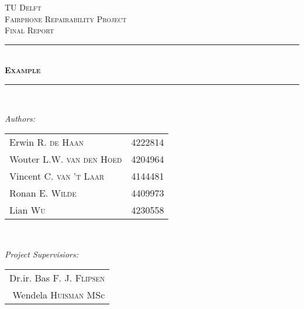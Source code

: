 \documentclass[12pt]{scrreprt}
\begin{document}
\begin{titlepage}

\newcommand{\HRule}{\rule{\linewidth}{0.5mm}} %

\center %
 

\textsc{\LARGE TU Delft}\\[1.5cm] %
\textsc{\Large Fairphone Repairability Project}\\[0.5cm] %
\textsc{\large Final Report}\\[0.5cm] %


\HRule \\[0.4cm]
\textsc{\huge \bfseries Example}\\[0.2cm] %
\HRule \\[1.5cm]
 

\begin{minipage}{0.45\textwidth}
\begin{flushleft} \large
\emph{Authors:}\\
\begin{tabular}{ll}
Erwin R. \textsc{de Haan} & 4222814\\
Wouter L.W. \textsc{van den Hoed} & 4204964 \\
Vincent C. \textsc{van 't Laar} & 4144481 \\
Ronan E. \textsc{Wilde} & 4409973 \\
Lian \textsc{Wu} & 4230558 \\
\end{tabular}

\end{flushleft}
\end{minipage}
~
\begin{minipage}{0.45\textwidth}
\begin{flushright} \large
\emph{Project Supervisiors:} \\
\begin{tabular}{r}
Dr.ir. Bas F. J. \textsc{Flipsen}\\
Wendela \textsc{Huisman} MSc\\
\end{tabular}
\end{flushright}
\end{minipage}\\[1.5cm]


\end{titlepage}
\end{document}
